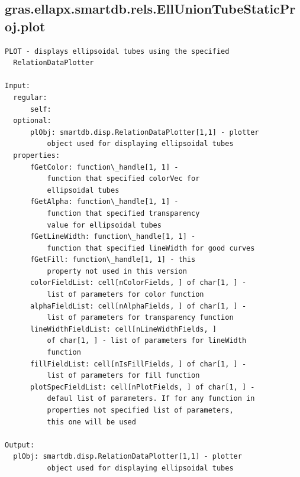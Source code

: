 \documentclass[letterpaper,10pt,english]{sphinxmanual}
\begin{document}
\subsection{gras.ellapx.smartdb.rels.EllUnionTubeStaticProj.plot}
\label{chap_functions:gras-ellapx-smartdb-rels-elluniontubestaticproj-plot}
\begin{Verbatim}[commandchars=\\\{\}]
PLOT - displays ellipsoidal tubes using the specified
  RelationDataPlotter

Input:
  regular:
      self:
  optional:
      plObj: smartdb.disp.RelationDataPlotter[1,1] - plotter
          object used for displaying ellipsoidal tubes
  properties:
      fGetColor: function\_handle[1, 1] -
          function that specified colorVec for
          ellipsoidal tubes
      fGetAlpha: function\_handle[1, 1] -
          function that specified transparency
          value for ellipsoidal tubes
      fGetLineWidth: function\_handle[1, 1] -
          function that specified lineWidth for good curves
      fGetFill: function\_handle[1, 1] - this
          property not used in this version
      colorFieldList: cell[nColorFields, ] of char[1, ] -
          list of parameters for color function
      alphaFieldList: cell[nAlphaFields, ] of char[1, ] -
          list of parameters for transparency function
      lineWidthFieldList: cell[nLineWidthFields, ]
          of char[1, ] - list of parameters for lineWidth
          function
      fillFieldList: cell[nIsFillFields, ] of char[1, ] -
          list of parameters for fill function
      plotSpecFieldList: cell[nPlotFields, ] of char[1, ] -
          defaul list of parameters. If for any function in
          properties not specified list of parameters,
          this one will be used

Output:
  plObj: smartdb.disp.RelationDataPlotter[1,1] - plotter
          object used for displaying ellipsoidal tubes
\end{Verbatim}
\end{document}
